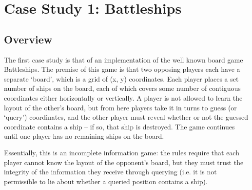 \section{Case Study 1: Battleships}

%
%
%
%
%
%
%
%
%
%
%
%
%
%

\subsection{Overview}

The first case study is that of an implementation of the well known board game Battleships. The premise of this game is that two opposing players each have a separate `board', which is a grid of (x, y) coordinates. Each player places a set number of ships on the board, each of which covers some number of contiguous coordinates either horizontally or vertically. A player is not allowed to learn the layout of the other's board, but from here players take it in turns to guess (or `query') coordinates, and the other player must reveal whether or not the guessed coordinate contains a ship -- if so, that ship is destroyed. The game continues until one player has no remaining ships on the board.

Essentially, this is an incomplete information game: the rules require that each player cannot know the layout of the opponent's board, but they must trust the integrity of the information they receive through querying (i.e. it is not permissible to lie about whether a queried position contains a ship).

